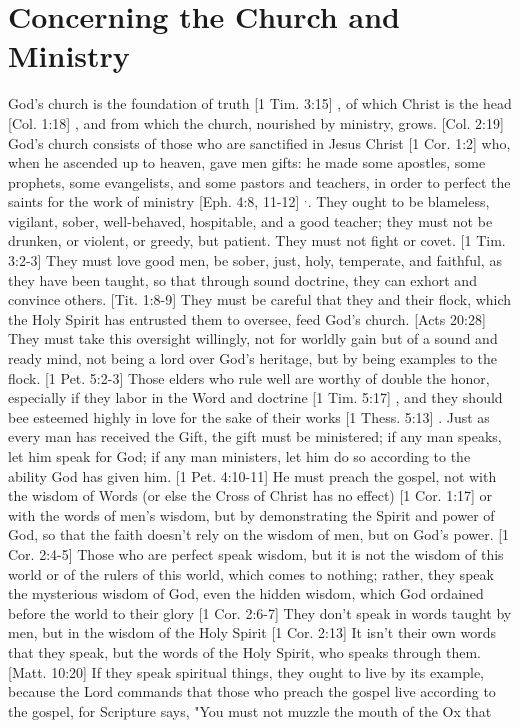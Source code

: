 \documentclass[../main.tex] {subfiles}
\begin{document}
	\section{Concerning the Church and Ministry}

	God's church is the foundation of truth [1 Tim. 3:15] , of which Christ is the head [Col. 1:18] , and from which the church, nourished by ministry, grows. [Col. 2:19]  God's church consists of those who are sanctified in Jesus Christ [1 Cor. 1:2]  who, when he ascended up to heaven, gave men gifts: he made some apostles, some prophets, some evangelists, and some pastors and teachers, in order to perfect the saints for the work of ministry [Eph. 4:8, 11-12] $^{,}$. They ought to be blameless, vigilant, sober, well-behaved, hospitable, and a good teacher; they must not be drunken, or violent, or greedy, but patient.  They must not fight or covet. [1 Tim. 3:2-3]  They must love good men, be sober, just, holy, temperate, and faithful, as they have been taught, so that through sound doctrine, they can exhort and convince others. [Tit. 1:8-9]  They must be careful that they and their flock, which the Holy Spirit has entrusted them to oversee, feed God's church. [Acts 20:28]  They must take this oversight willingly, not for worldly gain but of a sound and ready mind, not being a lord over God's heritage, but by being examples to the flock. [1 Pet. 5:2-3]  Those elders who rule well are worthy of double the honor, especially if they labor in the Word and doctrine [1 Tim. 5:17] , and they should bee esteemed highly in love for the sake of their works [1 Thess. 5:13] . Just as every man has received the Gift, the gift must be ministered; if any man speaks, let him speak for God; if any man ministers, let him do so according to the ability God has given him. [1 Pet. 4:10-11]  He must preach the gospel, not with the wisdom of Words (or else the Cross of Christ has no effect) [1 Cor. 1:17]  or with the words of men's wisdom, but by demonstrating the Spirit and power of God, so that the faith doesn't rely on the wisdom of men, but on God's power. [1 Cor. 2:4-5]  Those who are perfect speak wisdom, but it is not the wisdom of this world or of the rulers of this world, which comes to nothing; rather, they speak the mysterious wisdom of God, even the hidden wisdom, which God ordained before the world to their glory [1 Cor. 2:6-7]  They don't speak in words taught by men, but in the wisdom of the Holy Spirit [1 Cor. 2:13]  It isn't their own words that they speak, but the words of the Holy Spirit, who speaks through them. [Matt. 10:20]  If they speak spiritual things, they ought to live by its example, because the Lord commands that those who preach the gospel live according to the gospel, for Scripture says, "You must not muzzle the mouth of the Ox that 
\end{document}
